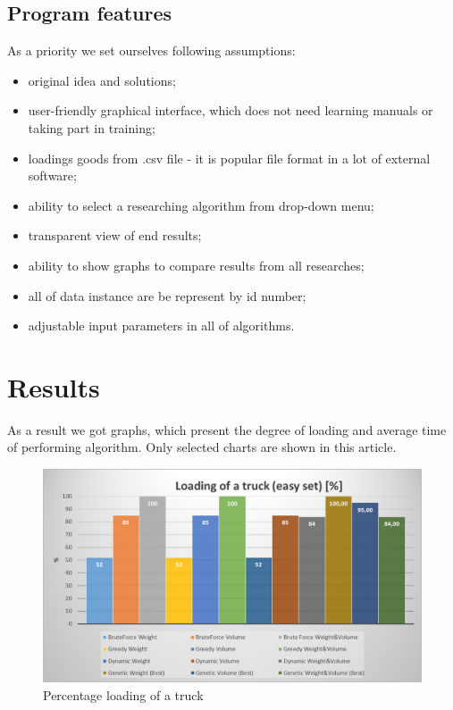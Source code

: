 \documentclass[conference,compsoc]{IEEEtran}
\begin{document}
\subsection{Program features}
As a priority we set ourselves following assumptions:
\begin{itemize}
\item original idea and solutions;
\item user-friendly graphical interface, which does not need learning manuals or taking part in training;
\item loadings goods from .csv file - it is popular file format in a lot of external software; 
\item ability to select a researching algorithm from drop-down menu;
\item transparent view of end results;
\item ability to show graphs to compare results from all researches;
\item all of data instance are be represent by id number;
\item adjustable input parameters in all of algorithms.
\end{itemize}


\section{Results}
As a result we got graphs, which present the degree of loading and average time of performing algorithm. Only selected charts are shown in this article.

\begin{figure}[H]
  \centering
  \includegraphics[width=\columnwidth]{image003.png}
  \caption{Percentage loading of a truck }
\end{figure}
\end{document}

